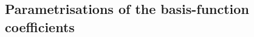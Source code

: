 \documentclass[nojss]{jss}
\def\mbf#1{{%
\mathchoice%
{\hbox{\boldmath$\displaystyle{#1}$}}%
{\hbox{\boldmath$\textstyle{#1}$}}%
{\hbox{\boldmath$\scriptstyle{#1}$}}%
{\hbox{\boldmath$\scriptscriptstyle{#1}$}}%
}}
\def\vec{\mbf}
\begin{document}
\begin{appendix}


\section{Parametrisations of the basis-function coefficients}
\label{Appendix:CovarianceTapering}


%
%

\end{appendix}
\end{document}
